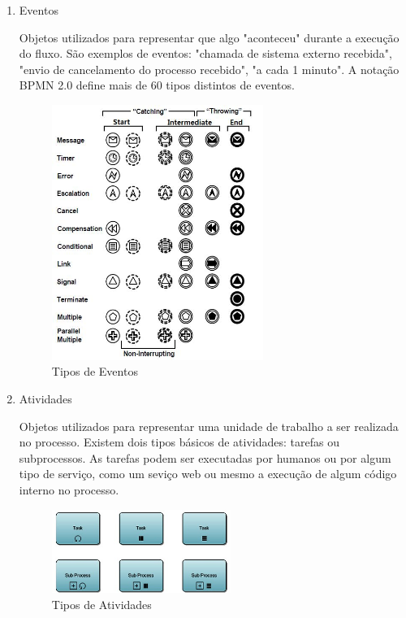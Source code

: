 \begin{enumerate}
    \item Eventos
    
    Objetos utilizados para representar que algo "aconteceu" durante a execução do fluxo. São exemplos de eventos: "chamada de sistema externo recebida", "envio de cancelamento do processo recebido", "a cada 1 minuto". A notação BPMN 2.0 define mais de 60 tipos distintos de eventos.
    
    \begin{figure}[H]
    \centering
    \includegraphics[width=0.65\textwidth]{imagens/bpmn_events.jpg}
    \caption{Tipos de Eventos}
    \label{fig:bpmn_events}
    \end{figure}
    
    \item Atividades
    
    Objetos utilizados para representar uma unidade de trabalho a ser realizada no processo. Existem dois tipos básicos de atividades: tarefas ou subprocessos. As tarefas podem ser executadas por humanos ou por algum tipo de serviço, como um seviço web ou mesmo a execução de algum código interno no processo.
    
    \begin{figure}[H]
    \centering
    \includegraphics[width=0.55\textwidth]{imagens/bpmn_activities.jpg}
    \caption{Tipos de Atividades}
    \label{fig:bpmn_activities}
    \end{figure}
    

\end{enumerate}
